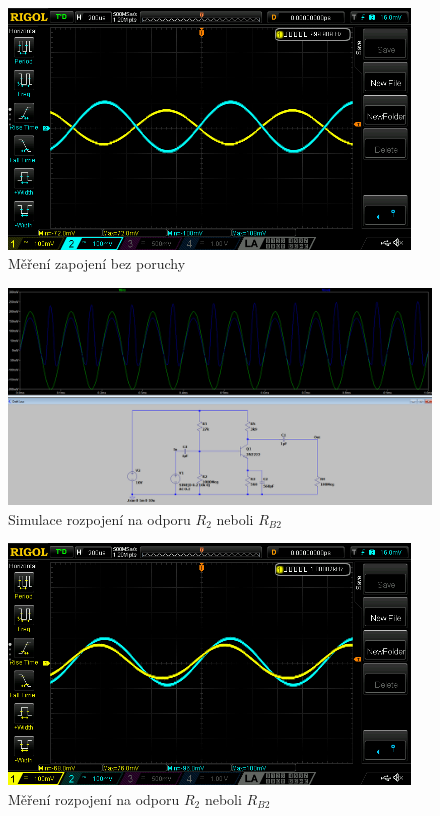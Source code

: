 \documentclass{article}
\begin{document}
\begin{figure}[H]
  \centering
  \includegraphics[width=0.95\textwidth]{mereni/NewFolder1/NewFile1.png}
  \caption{Měření zapojení bez poruchy}
  \label{fig:m-sch-se-p1}
\end{figure}


\begin{figure}[H]
  \centering
  \includegraphics[width=\textwidth]{sim/ukol1/porucha1.png}
  \caption{Simulace rozpojení na odporu \(R_2\) neboli \(R_{B2}\)}
  \label{fig:sch-se-p1}
\end{figure}

\begin{figure}[H]
  \centering
  \includegraphics[width=0.95\textwidth]{mereni/NewFolder1/NewFile2.png}
  \caption{Měření rozpojení na odporu \(R_2\) neboli \(R_{B2}\)}
  \label{fig:m-sch-se-p1}
\end{figure}
\end{document}
